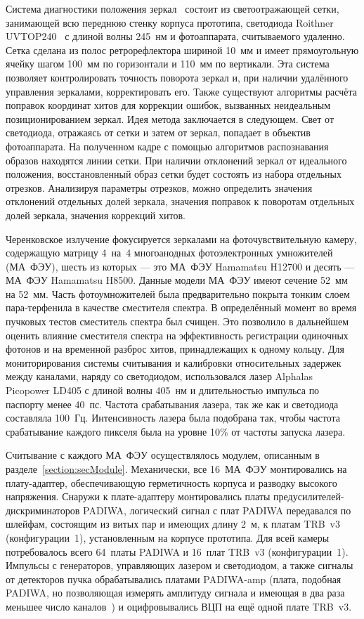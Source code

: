 Система диагностики положения зеркал~\cite{JORDANPR14} состоит из светоотражающей сетки, занимающей всю переднюю стенку корпуса прототипа, светодиода Roithner UVTOP240~\cite{LED} с длиной волны 245~нм и фотоаппарата, считываемого удаленно. Сетка сделана из полос ретрорефлектора шириной 10~мм и имеет прямоугольную ячейку шагом 100~мм по горизонтали и 110~мм по вертикали. Эта система позволяет контролировать точность поворота зеркал и, при наличии удалённого управления зеркалами, корректировать его. Также существуют алгоритмы расчёта поправок координат хитов для коррекции ошибок, вызванных неидеальным позиционированием зеркал. Идея метода заключается в следующем. Свет от светодиода, отражаясь от сетки и затем от зеркал, попадает в объектив фотоаппарата. На полученном кадре с помощью алгоритмов распознавания образов находятся линии сетки. При наличии отклонений зеркал от идеального положения, восстановленный образ сетки будет состоять из набора отдельных отрезков. Анализируя параметры отрезков, можно определить значения отклонений отдельных долей зеркала, значения поправок к поворотам отдельных долей зеркала, значения коррекций хитов.

Черенковское излучение фокусируется зеркалами на фоточувствительную камеру, содержащую матрицу 4~на~4 многоанодных фотоэлектронных умножителей (МА~ФЭУ), шесть из которых --- это МА~ФЭУ Hamamatsu H12700 и десять --- МА~ФЭУ Hamamatsu H8500. Данные модели МА~ФЭУ имеют сечение 52~мм на 52~мм. Часть фотоумножителей была предварительно покрыта тонким слоем пара-терфенила в качестве сместителя спектра. В определённый момент во время пучковых тестов сместитель спектра был счищен. Это позволило в дальнейшем оценить влияние сместителя спектра на эффективность регистрации одиночных фотонов и на временной разброс хитов, принадлежащих к одному кольцу. Для мониторирования системы считывания и калибровки относительных задержек между каналами, наряду со светодиодом, использовался лазер Alphalas Picopower LD405 с длиной волны 405~нм и длительностью импульса по паспорту менее 40~пс. Частота срабатывания лазера, так же как и светодиода составляла 100~Гц. Интенсивность лазера была подобрана так, чтобы частота срабатывание каждого пикселя была на уровне 10\% от частоты запуска лазера.

Считывание с каждого МА~ФЭУ осуществлялось модулем, описанным в разделе~\ref{section:secModule}. Механически, все 16~МА~ФЭУ монтировались на плату-адаптер, обеспечивающую герметичность корпуса и разводку высокого напряжения. Снаружи к плате-адаптеру монтировались платы предусилителей-дискриминаторов PADIWA, логический сигнал с плат PADIWA передавался по шлейфам, состоящим из витых пар и имеющих длину 2~м, к платам TRB~v3 (конфигурации~1), установленным на корпусе прототипа. Для всей камеры потребовалось всего 64~платы PADIWA и 16~плат TRB~v3 (конфигурации~1). Импульсы с генераторов, управляющих лазером и светодиодом, а также сигналы от детекторов пучка обрабатывались платами PADIWA-amp (плата, подобная PADIWA, но позволяющая измерять амплитуду сигнала и имеющая в два раза меньшее число каналов~\cite{}) и оцифровывались ВЦП на ещё одной плате TRB~v3.

